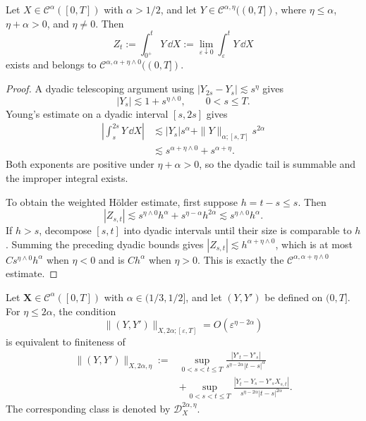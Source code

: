 \begin{thm}
Let $X\in\mathcal C^\alpha([0,T])$ with $\alpha>1/2$, and let
$Y\in\mathcal C^{\alpha,\eta}((0,T])$, where $\eta\le\alpha$,
$\eta+\alpha>0$, and $\eta\ne0$.  Then
\[
  Z_t:=\int_{0^+}^tY\,\dd X
  :=\lim_{\varepsilon\downarrow0}\int_\varepsilon^tY\,\dd X
\]
exists and belongs to
$\mathcal C^{\alpha,\alpha+\eta\wedge0}((0,T])$.
\end{thm}

\begin{proof}
A dyadic telescoping argument using
$|Y_{2s}-Y_s|\lesssim s^\eta$ gives
\[
  |Y_s|\lesssim 1+s^{\eta\wedge0},\qquad 0<s\le T.
\]
Young's estimate on a dyadic interval $[s,2s]$ gives
\begin{align*}
\left|\int_s^{2s}Y\,\dd X\right|
&\lesssim |Y_s|s^\alpha
 +\|Y\|_{\alpha;[s,T]}s^{2\alpha}\\
&\lesssim s^{\alpha+\eta\wedge0}+s^{\alpha+\eta}.
\end{align*}
Both exponents are positive under $\eta+\alpha>0$, so the dyadic tail is
summable and the improper integral exists.

To obtain the weighted Hölder estimate, first suppose $h=t-s\le s$.  Then
\[
 |Z_{s,t}|
 \lesssim s^{\eta\wedge0}h^\alpha
       +s^{\eta-\alpha}h^{2\alpha}
 \lesssim s^{\eta\wedge0}h^\alpha.
\]
If $h>s$, decompose $[s,t]$ into dyadic intervals until their size is
comparable to $h$.  Summing the preceding dyadic bounds gives
$|Z_{s,t}|\lesssim h^{\alpha+\eta\wedge0}$, which is at most
$Cs^{\eta\wedge0}h^\alpha$ when $\eta<0$ and is $Ch^\alpha$ when $\eta>0$.
This is exactly the $\mathcal C^{\alpha,\alpha+\eta\wedge0}$ estimate.
\end{proof}

\begin{prop}
Let $\mathbf X\in\mathscr C^\alpha([0,T])$ with
$\alpha\in(1/3,1/2]$, and let $(Y,Y')$ be defined on $(0,T]$.  For
$\eta\le2\alpha$, the condition
\[
  \|(Y,Y')\|_{X,2\alpha;[\varepsilon,T]}
  =O(\varepsilon^{\eta-2\alpha})
\]
is equivalent to finiteness of
\begin{align*}
\|(Y,Y')\|_{X,2\alpha,\eta}
:={}&\sup_{0<s<t\le T}
 \frac{|Y'_t-Y'_s|}{s^{\eta-2\alpha}|t-s|^\alpha}\\
&+\sup_{0<s<t\le T}
 \frac{|Y_t-Y_s-Y'_sX_{s,t}|}
      {s^{\eta-2\alpha}|t-s|^{2\alpha}}.
\end{align*}
The corresponding class is denoted by $\mathscr D_X^{2\alpha,\eta}$.
\end{prop}


